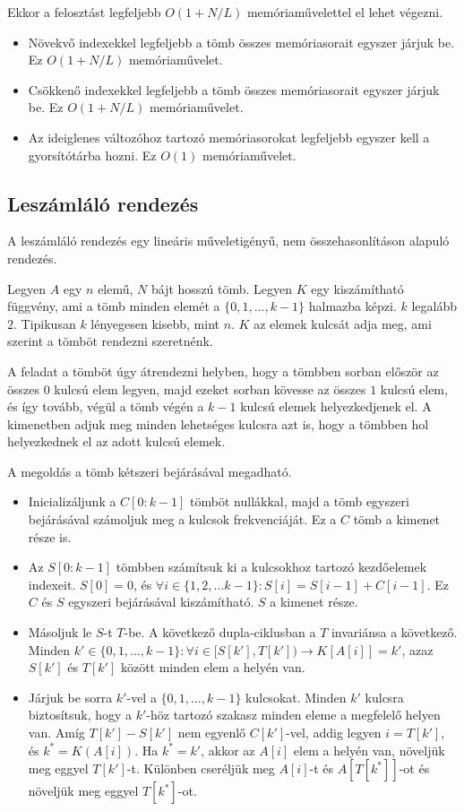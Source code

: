 \documentclass[12pt]{report}
\begin{document}
Ekkor a felosztást legfeljebb $O(1+N/L)$ memóriaművelettel el lehet végezni.
\begin{itemize}
\item Növekvő indexekkel legfeljebb a tömb összes memóriasorait egyszer járjuk be.
Ez $O(1+N/L)$ memóriaművelet.
\item Csökkenő indexekkel legfeljebb a tömb összes memóriasorait egyszer járjuk be.
Ez $O(1+N/L)$ memóriaművelet.
\item Az ideiglenes változóhoz tartozó memóriasorokat legfeljebb egyszer kell
a gyorsítótárba hozni. Ez $O(1)$ memóriaművelet.
\end{itemize}

\subsection{Leszámláló rendezés}

A leszámláló rendezés egy lineáris műveletigényű,
nem összehasonlításon alapuló rendezés.\cite{algoritmusok}

Legyen $A$ egy $n$ elemű, $N$ bájt hosszú tömb.
Legyen $K$ egy kiszámítható függvény, ami a tömb minden elemét
a $\{0, 1, ..., k-1\}$ halmazba képzi.
$k$ legalább $2$.
Tipikusan $k$ lényegesen kisebb, mint $n$.
$K$ az elemek kulcsát adja meg, ami szerint a tömböt rendezni szeretnénk.

A feladat a tömböt úgy átrendezni helyben,
hogy a tömbben sorban először az összes $0$ kulcsú elem legyen,
majd ezeket sorban kövesse az összes $1$ kulcsú elem, és így tovább,
végül a tömb végén a $k-1$ kulcsú elemek helyezkedjenek el.
A kimenetben adjuk meg minden lehetséges kulcsra azt is,
hogy a tömbben hol helyezkednek el az adott kulcsú elemek.

A megoldás a tömb kétszeri bejárásával megadható.
\begin{itemize}
\item Inicializáljunk a $C[0:k-1]$ tömböt nullákkal,
majd a tömb egyszeri bejárásával számoljuk meg a kulcsok frekvenciáját.
Ez a $C$ tömb a kimenet része is.
\item Az $S[0:k-1]$ tömbben számítsuk ki a kulcsokhoz tartozó kezdőelemek indexeit.
$S[0] = 0$, és $\forall i \in \{1, 2, ... k-1\}: S[i] = S[i-1]+C[i-1]$.
Ez $C$ és $S$ egyszeri bejárásával kiszámítható.
$S$ a kimenet része.
\item Másoljuk le $S$-t $T$-be.
A következő dupla-ciklusban a $T$ invariánsa a következő.
Minden $k' \in \{0, 1, ..., k-1\}: \forall i \in [S[k'], T[k']) \rightarrow K[A[i]]=k'$,
azaz $S[k']$ és $T[k']$ között minden elem a helyén van.
\item Járjuk be sorra $k'$-vel a $\{0, 1, ..., k-1\}$ kulcsokat.
Minden $k'$ kulcsra biztosítsuk, hogy a $k'$-höz tartozó szakasz
minden eleme a megfelelő helyen van.
Amíg $T[k']-S[k']$ nem egyenlő $C[k']$-vel,
addig legyen $i=T[k']$,
és $k^*=K(A[i])$.
Ha $k^*=k'$, akkor az $A[i]$ elem a helyén van, növeljük meg eggyel $T[k']$-t.
Különben cseréljük meg $A[i]$-t és $A[T[k^*]]$-ot
és növeljük meg eggyel $T[k^*]$-ot.
\end{itemize}
\end{document}
